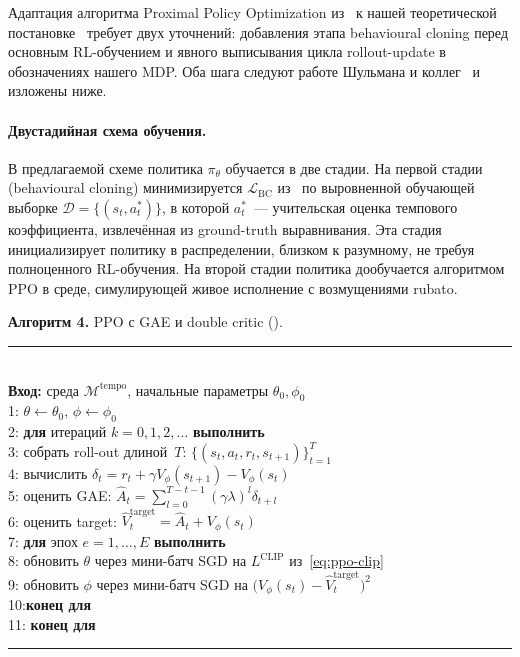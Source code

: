 %
Адаптация алгоритма Proximal Policy Optimization
из~ к нашей теоретической
постановке~ требует двух уточнений: добавления
этапа behavioural cloning перед основным RL-обучением и явного
выписывания цикла rollout-update в обозначениях нашего MDP. Оба
шага следуют работе Шульмана и коллег~\cite{Schulman2017PPO} и
изложены ниже.

\paragraph*{Двустадийная схема обучения.} В предлагаемой схеме
политика $\pi_\theta$ обучается в две стадии. На первой
стадии (behavioural cloning) минимизируется
$\mathcal{L}_{\text{BC}}$ из~ по выровненной
обучающей выборке $\mathcal{D} = \{(s_t, a^*_t)\}$, в которой
$a^*_t$~--- учительская оценка темпового коэффициента,
извлечённая из ground-truth выравнивания. Эта стадия
инициализирует политику в распределении, близком к разумному,
не требуя полноценного RL-обучения. На второй стадии политика
дообучается алгоритмом PPO в среде, симулирующей живое
исполнение с возмущениями rubato.

\par\addvspace{2pt}
{\centering
\begin{minipage}{0.97\linewidth}
\footnotesize
\textbf{Алгоритм 4.} PPO с GAE и double critic
(\cite[\S~6]{Schulman2017PPO}). \\[1pt]
\rule{\linewidth}{0.4pt}\vspace{1pt}\\
\textbf{Вход:} среда $\mathcal{M}^{\text{tempo}}$, начальные
параметры $\theta_0,\phi_0$ \\
1: $\theta \gets \theta_0$, $\phi \gets \phi_0$ \\
2: \textbf{для} итераций $k = 0, 1, 2, \dots$ \textbf{выполнить} \\
3: \quad собрать roll-out длиной~$T$:
   $\{(s_t, a_t, r_t, s_{t+1})\}_{t=1}^{T}$ \\
4: \quad вычислить $\delta_t = r_t + \gamma V_\phi(s_{t+1}) -
   V_\phi(s_t)$ \\
5: \quad оценить GAE: $\hat A_t = \sum_{l=0}^{T-t-1}
   (\gamma\lambda)^l \delta_{t+l}$ \\
6: \quad оценить target: $\hat V^{\text{target}}_t = \hat A_t
   + V_\phi(s_t)$ \\
7: \quad \textbf{для} эпох $e = 1,\dots,E$ \textbf{выполнить} \\
8: \quad\quad обновить $\theta$ через мини-батч SGD на $L^{\text{CLIP}}$
   из~\eqref{eq:ppo-clip} \\
9: \quad\quad обновить $\phi$ через мини-батч SGD на
   $\bigl(V_\phi(s_t) - \hat V^{\text{target}}_t\bigr)^2$ \\
10:\quad \textbf{конец для} \\
11: \textbf{конец для} \\
\rule{\linewidth}{0.4pt}
\end{minipage}\par}
\addvspace{4pt}

